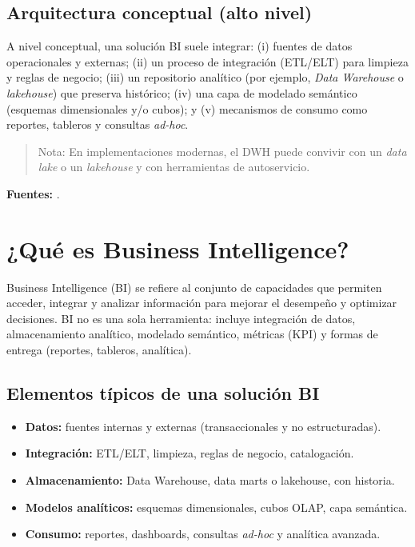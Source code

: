 \documentclass[12pt]{article}
\begin{document}
\subsection*{Arquitectura conceptual (alto nivel)}
A nivel conceptual, una solución BI suele integrar: (i) fuentes de datos operacionales y externas; (ii) un proceso de integración (ETL/ELT) para limpieza y reglas de negocio; (iii) un repositorio analítico (por ejemplo, \textit{Data Warehouse} o \textit{lakehouse}) que preserva histórico; (iv) una capa de modelado semántico (esquemas dimensionales y/o cubos); y (v) mecanismos de consumo como reportes, tableros y consultas \textit{ad-hoc}.

\begin{quote}\small
Nota: En implementaciones modernas, el DWH puede convivir con un \textit{data lake} o un \textit{lakehouse} y con herramientas de autoservicio.
\end{quote}

\noindent\textbf{Fuentes:} \cite{gartner_abi, ibm_bi, oracle_bi, gartner_bi_platforms}.

\section{¿Qué es Business Intelligence?}
Business Intelligence (BI) se refiere al conjunto de capacidades que permiten acceder, integrar y analizar información para mejorar el desempeño y optimizar decisiones. BI no es una sola herramienta: incluye integración de datos, almacenamiento analítico, modelado semántico, métricas (KPI) y formas de entrega (reportes, tableros, analítica).

\subsection*{Elementos típicos de una solución BI}
\begin{itemize}[leftmargin=*, itemsep=0.25em]
  \item \textbf{Datos:} fuentes internas y externas (transaccionales y no estructuradas).
  \item \textbf{Integración:} ETL/ELT, limpieza, reglas de negocio, catalogación.
  \item \textbf{Almacenamiento:} Data Warehouse, data marts o lakehouse, con historia.
  \item \textbf{Modelos analíticos:} esquemas dimensionales, cubos OLAP, capa semántica.
  \item \textbf{Consumo:} reportes, dashboards, consultas \textit{ad-hoc} y analítica avanzada.
\end{itemize}
\end{document}
